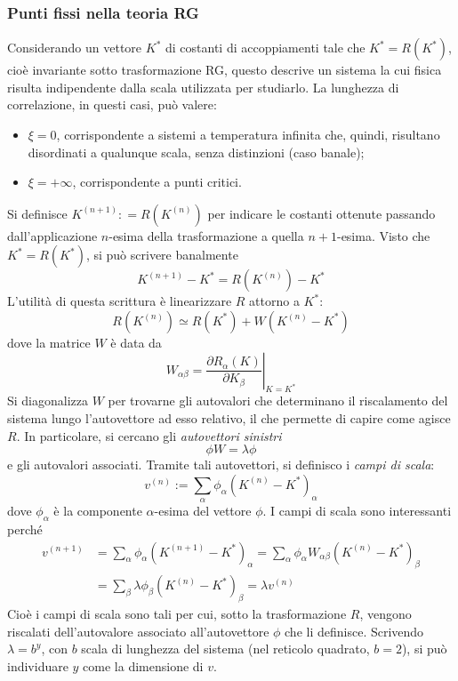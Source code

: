\documentclass[11pt, a4paper]{scrartcl}
\theoremstyle{style}
\theoremstyle{style1}
\newcommand*\Eval[3]{\left.#1\right\rvert_{#2}^{#3}}
\numberwithin{equation}{subsection}
\begin{document}
\subsubsection{Punti fissi nella teoria RG}
Considerando un vettore $K^*$ di costanti di accoppiamenti tale che $K^* = R (K^*)$, cio\`e invariante sotto trasformazione RG, questo descrive un sistema la cui fisica risulta indipendente dalla scala utilizzata per studiarlo.
La lunghezza di correlazione, in questi casi, pu\`o valere:
\begin{itemize}
	\item $\xi  = 0$, corrispondente a sistemi a temperatura infinita che, quindi, risultano disordinati a qualunque scala, senza distinzioni (caso banale);
	\item $\xi  = +\infty$, corrispondente a punti critici.
\end{itemize}
Si definisce $K^{(n+1)} : = R\left(K^{(n)}\right) $ per indicare le costanti ottenute passando dall'applicazione $n$-esima della trasformazione a quella $n+1$-esima.
Visto che $K^* = R(K^*)$, si pu\`o scrivere banalmente
\[
K ^{(n+1)} - K ^* = R\left(K^{(n)}\right)  - K^*
\] 
L'utilit\`a di questa scrittura \`e linearizzare $R$ attorno a $K^*$:
\[
R\left(K^{(n)}\right) \simeq R(K^*) + W \left(K^{(n)}- K^*\right) 
\] 
dove la matrice $W$ \`e data da 
\[
	W_{\alpha \beta } = \Eval{\frac{\partial R_\alpha (K)}{\partial K_\beta } }{K=K^*}{}
\] 
Si diagonalizza $W$ per trovarne gli autovalori che determinano il riscalamento del sistema lungo l'autovettore ad esso relativo, il che permette di capire come agisce $R$.
In particolare, si cercano gli \textit{autovettori sinistri} 
\[
\phi W = \lambda \phi 
\] 
e gli autovalori associati.
Tramite tali autovettori, si definisco i \textit{campi di scala}:
\[
v^{(n)}:= \sum_{\alpha }^{} \phi _\alpha  \left(K^{(n)}- K^* \right) _\alpha 
\] 
dove $\phi _\alpha $ \`e la componente $\alpha $-esima del vettore $\phi $.
I campi di scala sono interessanti perch\'e 
\[
	\begin{split}
		v^{(n+1)}&= \sum_{\alpha }^{} \phi _\alpha \left(K^{(n+1)} - K^*\right) _\alpha = \sum_{\alpha }^{} \phi _\alpha W_{\alpha \beta } \left( K^{(n)}- K^*\right) _\beta \\
			 &= \sum_{\beta }^{} \lambda \phi _\beta \left(K^{(n)}-K^*\right) _\beta  = \lambda v ^{(n)}
	\end{split}
\] 
Cio\`e i campi di scala sono tali per cui, sotto la trasformazione $R$, vengono riscalati dell'autovalore associato all'autovettore $\phi $ che li definisce.
Scrivendo $\lambda = b^{y}$, con $b$ scala di lunghezza del sistema (nel reticolo quadrato, $b=2$), si pu\`o individuare $y$ come la dimensione di $v$.
\end{document}
